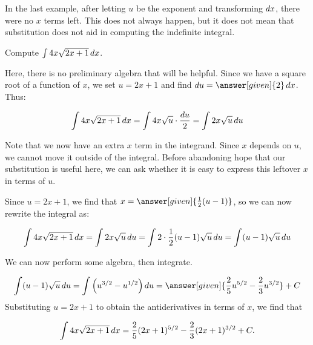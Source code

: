 \documentclass[nooutcomes]{ximera}
\begin{document}
In the last example, after letting $u$ be the exponent and transforming $\mathop{}\!d x$, there were no $x$ terms left.  This does not always happen, but it does not mean that substitution does not aid in computing the indefinite integral.

\begin{example}
Compute $\int 4x \sqrt{2x+1} \mathop{}\!d x$.

\begin{explanation}
Here, there is no preliminary algebra that will be helpful.  Since we have a square root of a function of $x$, we set $u=2x+1$ and find $\d u = \answer[given]{2} \d x$.  Thus:

\[
\int 4x \sqrt{2x+1} \mathop{}\!d x = \int 4x \sqrt{u} \cdot  \frac{\mathop{}\!d u}{2} =  \int 2x \sqrt{u} \mathop{}\!d u
\]

Note that we now have an extra $x$ term in the integrand.  Since $x$ depends on $u$, we cannot move it outside of the integral.  Before abandoning hope that our substitution is useful here, we can ask whether it is easy to express this leftover $x$ in terms of $u$.  

Since $u= 2x+1$, we find that $x = \answer[given]{\frac{1}{2}(u-1)}$, so we can now rewrite the integral as:

\[
\int 4x \sqrt{2x+1} \mathop{}\!d x =  \int 2x \sqrt{u} \mathop{}\!d u = \int 2 \cdot \frac{1}{2}(u-1) \sqrt{u} \mathop{}\!d u = \int (u-1)\sqrt{u} \mathop{}\!d u
\]

We can now perform some algebra, then integrate.

\[
 \int (u-1)\sqrt{u} \d u = \int \left(u^{3/2} - u^{1/2} \right) \d u = \answer[given]{\frac{2}{5} u^{5/2} - \frac{2}{3} u^{3/2}} +C
\]
Substituting $u=2x+1$ to obtain the antiderivatives in terms of $x$, we find that

\[
\int 4x \sqrt{2x+1} \mathop{}\!d x =  \frac{2}{5} (2x+1)^{5/2} - \frac{2}{3} (2x+1)^{3/2} +C.
\]
\end{explanation}
\end{example}
\end{document}

